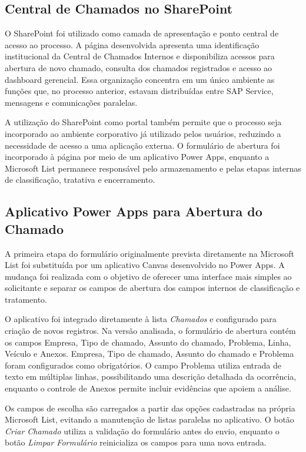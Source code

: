 \subsection{Central de Chamados no SharePoint}

O SharePoint foi utilizado como camada de apresentação e
ponto central de acesso ao processo. A página desenvolvida
apresenta uma identificação institucional da Central de
Chamados Internos e disponibiliza acessos para abertura de
novo chamado, consulta dos chamados registrados e acesso ao
dashboard gerencial. Essa organização concentra em um único
ambiente as funções que, no processo anterior, estavam
distribuídas entre SAP Service, mensagens e comunicações
paralelas.

A utilização do SharePoint como portal também permite que o
processo seja incorporado ao ambiente corporativo já
utilizado pelos usuários, reduzindo a necessidade de
acesso a uma aplicação externa. O formulário de abertura
foi incorporado à página por meio de um aplicativo Power
Apps, enquanto a Microsoft List permanece responsável pelo
armazenamento e pelas etapas internas de classificação,
tratativa e encerramento.

\subsection{Aplicativo Power Apps para Abertura do Chamado}

A primeira etapa do formulário originalmente prevista
diretamente na Microsoft List foi substituída por um
aplicativo Canvas desenvolvido no Power Apps. A mudança foi
realizada com o objetivo de oferecer uma interface mais
simples ao solicitante e separar os campos de abertura dos
campos internos de classificação e tratamento.

O aplicativo foi integrado diretamente à lista
\textit{Chamados} e configurado para criação de novos
registros. Na versão analisada, o formulário de abertura
contém os campos Empresa, Tipo de chamado, Assunto do
chamado, Problema, Linha, Veículo e Anexos. Empresa, Tipo
de chamado, Assunto do chamado e Problema foram
configurados como obrigatórios. O campo Problema utiliza
entrada de texto em múltiplas linhas, possibilitando uma
descrição detalhada da ocorrência, enquanto o controle de
Anexos permite incluir evidências que apoiem a análise.

Os campos de escolha são carregados a partir das opções
cadastradas na própria Microsoft List, evitando a
manutenção de listas paralelas no aplicativo. O botão
\textit{Criar Chamado} utiliza a validação do formulário
antes do envio, enquanto o botão \textit{Limpar Formulário}
reinicializa os campos para uma nova entrada.

